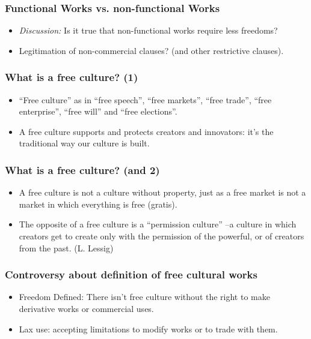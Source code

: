 \begin{frame}
\frametitle{Functional Works vs. non-functional Works}
\begin{itemize}
\item \textit{Discussion:} Is it true that non-functional works require \alert{less} freedoms? \\

\pause

\item Legitimation of non-commercial clauses? (and other restrictive clauses).
\end{itemize}                                                 

\end{frame}


\begin{frame}
\frametitle{What is a free culture? (1)}
\begin{itemize}
\pause
\item ``Free culture'' as in ``free speech'', ``free markets'', ``free  trade'', ``free enterprise'', ``free will'' and ``free elections''.
\item A free culture supports and protects creators and innovators: it's the traditional way our culture is built.
\end{itemize}

\end{frame}

\begin{frame}
\frametitle{What is a free culture? (and 2)}
\begin{itemize}
\item A free culture is not a culture without property, just as a free market is not a
market in which everything is free (gratis). 
\item  The opposite of a free culture is a ``permission culture'' --a culture in which creators get to create only with the permission of the powerful, or of creators from the past. (L. Lessig)

\end{itemize}

\end{frame}



\begin{frame}
\frametitle{Controversy about definition of free cultural works}

\begin{itemize}
\item \alert{Freedom Defined}: There isn't free culture without the right to make derivative works or commercial uses.
\item \alert{Lax use}: accepting limitations to modify works or to trade with them.
\end{itemize}                                                 

\end{frame}


